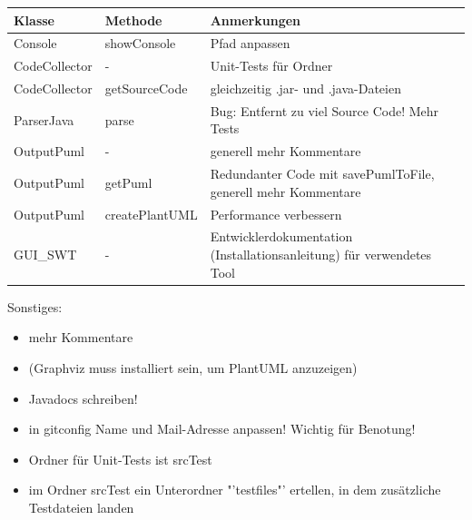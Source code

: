 \begin{table}[H]

\begin{tabularx}{\textwidth}{ |l|l|X| }
\hline
\textbf{Klasse} & \textbf{Methode} & \textbf{Anmerkungen}\\
 \hline
Console & showConsole & Pfad anpassen \\
CodeCollector & - & Unit-Tests für Ordner \\
CodeCollector & getSourceCode & gleichzeitig .jar- und .java-Dateien \\
ParserJava & parse & Bug: Entfernt zu viel Source Code! Mehr Tests\\
OutputPuml & - & generell mehr Kommentare \\
OutputPuml & getPuml & Redundanter Code mit savePumlToFile, generell mehr Kommentare\\
OutputPuml & createPlantUML & Performance verbessern \\
GUI\_SWT & - & Entwicklerdokumentation (Installationsanleitung) für verwendetes Tool\\
\hline
\end{tabularx}
\end{table}

Sonstiges:
\begin{itemize}
\item mehr Kommentare
\item (Graphviz muss installiert sein, um PlantUML anzuzeigen)
\item Javadocs schreiben!
\item in gitconfig Name und Mail-Adresse anpassen! Wichtig für Benotung!
\item Ordner für Unit-Tests ist srcTest
\item im Ordner srcTest ein Unterordner "'testfiles"' ertellen, in dem zusätzliche Testdateien landen
\end{itemize}
\nsecend

